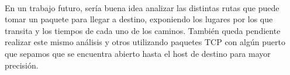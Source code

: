 ~

En un trabajo futuro, sería buena idea analizar las distintas rutas que puede tomar un paquete para llegar a destino, exponiendo los lugares por los que transita y los tiempos de cada uno de los caminos. También queda pendiente realizar este mismo análisis y otros utilizando paquetes TCP con algún puerto que sepamos que se encuentra abierto hasta el host de destino para mayor precisión.

